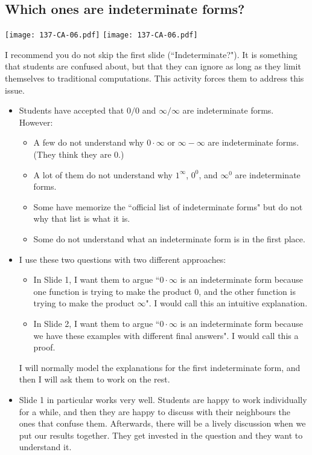 \documentclass[11pt]{article}
\newcommand{\nl}{\hfill \vspace{-1.1\baselineskip}} %
\begin{document}
\subsection{Which ones are indeterminate forms?}

\begin{center}
{ \texttt{[image: 137-CA-06.pdf]}} \quad
{ \texttt{[image: 137-CA-06.pdf]}} 
\end{center}

\begin{warning}
	I recommend you do not skip the first slide (``Indeterminate?").   It is something that students are confused about, but that they can ignore as long as they limit themselves to traditional computations.  This activity forces them to address this issue.
\end{warning}
\begin{comments}
\nl
	\begin{itemize}
		\item  Students have accepted that $0/0$ and $\infty/\infty$ are indeterminate forms.  However:
			\begin{itemize}
				\item  A few do not understand why $0 \cdot \infty$ or $\infty - \infty$ are indeterminate forms.  (They think they are $0$.)
				\item A lot of them do not understand why $1^{\infty}$, $0^0$, and $\infty^{0}$ are indeterminate forms.
				\item Some have memorize the ``official list of indeterminate forms" but do not why that list is what it is.
				\item  Some do not understand what an indeterminate form is in the first place.
			\end{itemize}
		\item  I use these two questions with two different approaches:
			\begin{itemize}
				\item  In Slide 1, I want them to argue ``$0 \cdot \infty$ is an indeterminate form because one function is trying to make the product 0, and the other function is trying to make the product $\infty$".  I would call this an intuitive explanation.
				\item  In Slide 2, I want them to argue ``$0 \cdot \infty$ is an indeterminate form because we have these examples with different final answers".  I would call this a proof.
			\end{itemize}
			I will normally model the explanations for the first indeterminate form, and then I will ask them to work on the rest.
		\item Slide 1 in particular works very well.  Students are happy to work individually for a while, and then they are happy to discuss with their neighbours the ones that confuse them.    Afterwards, there will be a lively discussion when we put our results together.  They get invested in the question and they want to understand it.
	\end{itemize}
\end{comments}
\end{document}
